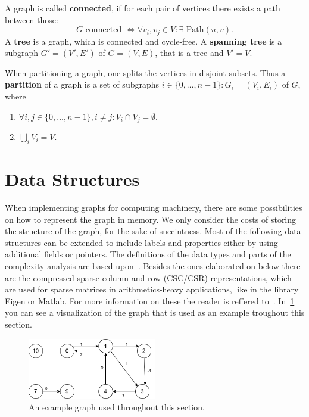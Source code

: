         A graph is called \textbf{connected}, if for each pair of vertices there exists a path between those: 
        \[G \text{ connected } \Leftrightarrow \forall v_i, v_j \in V: \exists \text{ Path}(u, v).\]
        A \textbf{tree} is a graph, which is connected and cycle-free. 
        A \textbf{spanning tree} is a subgraph $G' = (V', E')$ of $G = (V, E)$, that is a tree and $V' = V$. 
        
        When partitioning a graph, one splits the vertices in disjoint subsets. 
        Thus a \textbf{partition} of a graph is a set of subgraphs $i\in \{0, \dots, n-1\}: G_i = (V_i, E_i)$ of $G$, where 
        \begin{enumerate}
            \item $\forall i,j \in \{0, \dots, n-1\}, i \neq j: V_i \cap V_j = \emptyset$.
            \item $\bigcup_i V_i = V$.
        \end{enumerate}
            
    \section{Data Structures}\label{\positionnumber}
        When implementing graphs for computing machinery, there are some possibilities on how to represent the graph in memory.
        We only consider the costs of storing the structure of the graph, for the sake of succintness. 
        Most of the following data structures can be extended to include labels and properties either by using additional fields or pointers. 
        The definitions of the data types and parts of the complexity analysis are based upon~\autocite{Gross1998GraphTA, aho1974design, cormen2009introduction, Goodrich2014AlgorithmDA, steinhaus2010g}. 
        Besides the ones elaborated on below there are the compressed sparse column and row (CSC/CSR) representations, which are used for sparse matrices in arithmetics-heavy applications, like in the library Eigen or Matlab. 
        For more information on these the reader is reffered to~\autocite{steinhaus2010g, Eisenstat1982YaleSM}. In~\ref{data_struct-ex} you can see a visualization of the graph that is used as an example troughout this section.
        
        \begin{figure}[htp]
            \begin{center}
                \includegraphics[keepaspectratio,width=0.5\textwidth]{img/03-graphs/data_struct_gr.png}
            \end{center}
            \caption{An example graph used throughout this section.} 
            \label{data_struct-ex}
        \end{figure}
        
